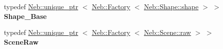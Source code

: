 \begin{DoxyCompactItemize}
\item 
\hypertarget{classNeb_1_1master_a5769c0b1668ef16b6641e24535fb6f1b}{typedef \hyperlink{classNeb_1_1unique__ptr}{\-Neb\-::unique\-\_\-ptr}\*
$<$ \hyperlink{classNeb_1_1Factory}{\-Neb\-::\-Factory}\*
$<$ \hyperlink{classNeb_1_1Shape_1_1shape}{\-Neb\-::\-Shape\-::shape} $>$ $>$ {\bfseries \-Shape\-\_\-\-Base}}\label{classNeb_1_1master_a5769c0b1668ef16b6641e24535fb6f1b}

\item 
\hypertarget{classNeb_1_1master_a457975f9c68d4269b8c63d22a16d1c2f}{typedef \hyperlink{classNeb_1_1unique__ptr}{\-Neb\-::unique\-\_\-ptr}\*
$<$ \hyperlink{classNeb_1_1Factory}{\-Neb\-::\-Factory}\*
$<$ \hyperlink{classNeb_1_1Scene_1_1raw}{\-Neb\-::\-Scene\-::raw} $>$ $>$ {\bfseries \-Scene\-Raw}}\label{classNeb_1_1master_a457975f9c68d4269b8c63d22a16d1c2f}

\end{DoxyCompactItemize}
